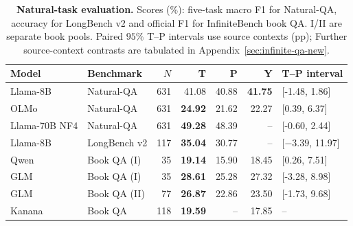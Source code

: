 \begin{table}[ht]
\centering\small
\caption{\textbf{Natural-task evaluation.} Scores (\%): five-task macro F1 for Natural-QA, accuracy for LongBench v2 and official F1 for InfiniteBench book QA. I/II are separate book pools. Paired $95\%$ T--P intervals use source contexts (pp); Further source-context contrasts are tabulated in Appendix~\ref{sec:infinite-qa-new}.}
\label{tab:natural-transfer-main}
\begin{tabular}{@{}llrrrrl@{}}
\toprule
Model & Benchmark & $N$ & T & P & Y & T--P interval \\
\midrule
Llama-8B & Natural-QA & 631 & 41.08 & 40.88 & \textbf{41.75} & [-1.48, 1.86] \\
OLMo & Natural-QA & 631 & \textbf{24.92} & 21.62 & 22.27 & [0.39, 6.37] \\
Llama-70B NF4 & Natural-QA & 631 & \textbf{49.28} & 48.39 & -- & [-0.60, 2.44] \\
Llama-8B & LongBench v2 & 117 & \textbf{35.04} & 30.77 & -- & [$-3.39$, 11.97] \\
Qwen & Book QA (I) & 35 & \textbf{19.14} & 15.90 & 18.45 & [0.26, 7.51] \\
GLM & Book QA (I) & 35 & \textbf{28.61} & 25.28 & 27.32 & [-3.28, 8.98] \\
GLM & Book QA (II) & 77 & \textbf{26.87} & 22.86 & 23.50 & [-1.73, 9.68] \\
Kanana & Book QA & 118 & \textbf{19.59} & -- & 17.85 & -- \\
\bottomrule
\end{tabular}
\end{table}
